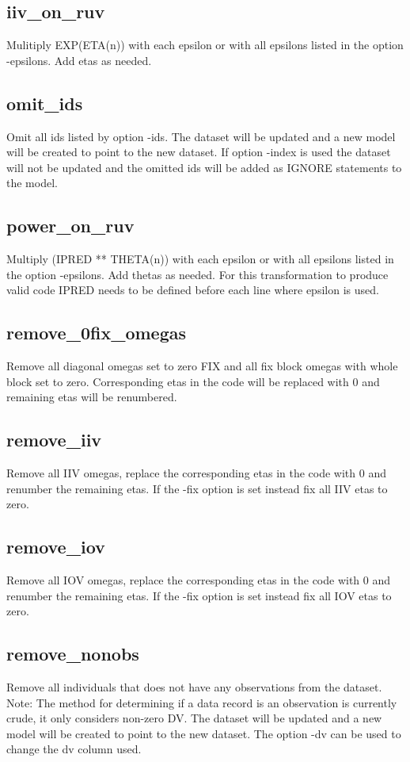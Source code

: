 \subsection{iiv\_on\_ruv}
Mulitiply EXP(ETA(n)) with each epsilon or with all epsilons listed in the option -epsilons. Add etas as needed.

\subsection{omit\_ids}
Omit all ids listed by option -ids. The dataset will be updated and a new model will be created to point to the new dataset. If option -index is used the dataset will not be updated and the omitted ids will be added as IGNORE statements to the model.

\subsection{power\_on\_ruv}
Multiply (IPRED ** THETA(n)) with each epsilon or with all epsilons listed in the option -epsilons. Add thetas as needed. For this transformation to produce valid code IPRED needs to be defined before each line where epsilon is used.

\subsection{remove\_0fix\_omegas}
Remove all diagonal omegas set to zero FIX and all fix block omegas with whole block set to zero. Corresponding etas in the code will be replaced with 0 and remaining etas will be renumbered.

\subsection{remove\_iiv}
Remove all IIV omegas, replace the corresponding etas in the code with 0 and renumber the remaining etas. If the -fix option is set instead fix all IIV etas to zero.

\subsection{remove\_iov}
Remove all IOV omegas, replace the corresponding etas in the code with 0 and renumber the remaining etas. If the -fix option is set instead fix all IOV etas to zero.

\subsection{remove\_nonobs}
Remove all individuals that does not have any observations from the dataset. Note: The method for determining if a data record is an observation is currently crude, it only considers non-zero DV. The dataset will be updated and a new model will be created to point to the new dataset. The option -dv can be used to
change the dv column used.


